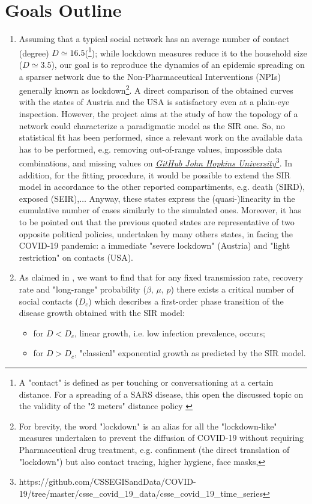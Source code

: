 \documentclass[a4paper,11pt,twoside]{book} %
\begin{document}
\section{Goals Outline}

\begin{enumerate}
	\item Assuming that a typical social network has an average number of contact (degree) $D\simeq16.5$(\cite{Liu::2021_Review_SContactPattern}\footnote{A "contact" is defined as per touching or conversationing at a certain distance. For a spreading of a SARS disease, this open the discussed topic on the validity of the "2 meters" distance policy \cite{Jones::2020_2metersSDIstance}}); while lockdown measures reduce it to the household size ($D\simeq3.5$\cite{Liu::2021_Review_SContactPattern}), our goal is to reproduce the dynamics of an epidemic spreading on a sparser network due to the Non-Pharmaceutical Interventions (NPIs) generally known as lockdown\footnote{For brevity, the word "lockdown" is an alias for all the "lockdown-like" measures undertaken to prevent the diffusion of COVID-19 without requiring Pharmaceutical drug treatment, e.g. confinment (the direct translation of "lockdown") but also contact tracing, higher hygiene, face masks,}. A direct comparison of the obtained curves with the states of Austria and the USA \cite{Thurner::NetBasedExpl} is satisfactory even at a plain-eye inspection. However, the project aims at the study of how the topology of a network could characterize a paradigmatic model as the SIR one. 
    So, no statistical fit has been performed, since a relevant work on the available data has to be performed, e.g. removing out-of-range values, impossible data combinations, and missing values on \href{https://github.com/CSSEGISandData/COVID-19/tree/master/csse_covid_19_data/csse_covid_19_time_series}{\textit{GitHub John Hopkins University}}\footnote{https://github.com/CSSEGISandData/COVID-19/tree/master/csse\_covid\_19\_data/csse\_covid\_19\_time\_series}. In addition, for the fitting procedure, it would be possible to extend the SIR model in accordance to the other reported compartiments, e.g. death (SIRD), exposed (SEIR),$\dots$
	Anyway, these states express the (quasi-)linearity in the cumulative number of cases similarly to the simulated ones.
    Moreover, it has to be pointed out that the previous quoted states are representative of two opposite political policies, undertaken by many others states, in facing the COVID-19 pandemic: a immediate "severe lockdown" (Austria) and "light restriction" on contacts (USA).
	\item As claimed in \cite{Thurner::NetBasedExpl}, we want to find that for any fixed transmission rate, recovery rate and "long-range" probability ($\beta, \, \mu, \, p$) there exists a critical number of social contacts ($D_c$) which describes a first-order phase transition of the disease growth obtained with the SIR model:
	\begin{itemize}
		\item for $D<D_c$, linear growth, i.e. low infection prevalence, occurs;
		\item for $D>D_c$, "classical" exponential growth as predicted by the SIR model.
	\end{itemize}


\end{enumerate}
\end{document}
